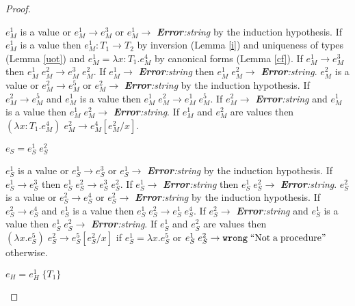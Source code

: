 \begin{theorem}
\begin{proof}
\begin{case}
$e_{M}^{1}$ is a value or $e_{M}^{1}\rightarrow e_{M}^{3}$ or $e_{M}^{1}\rightarrow$ \emph{\textbf{Error}:\;string} by the induction hypothesis.  If $e_{M}^{1}$ is a value then $e_{M}^{1}:T_{1}\rightarrow T_{2}$ by inversion (Lemma \ref{i}) and uniqueness of types (Lemma \ref{uot}) and $e_{M}^{1}=\lambda x:T_{1}.e_{M}^{4}$ by canonical forms (Lemma \ref{cf}).  If $e_{M}^{1}\rightarrow e_{M}^{3}$ then $e_{M}^{1}\;e_{M}^{2}\rightarrow e_{M}^{3}\;e_{M}^{2}$.  If $e_{M}^{1}\rightarrow$ \emph{\textbf{Error}:\;string} then $e_{M}^{1}\;e_{M}^{2}\rightarrow$ \emph{\textbf{Error}:\;string}.  $e_{M}^{2}$ is a value or $e_{M}^{2}\rightarrow e_{M}^{5}$ or $e_{M}^{2}\rightarrow$ \emph{\textbf{Error}:\;string} by the induction hypothesis.  If $e_{M}^{2}\rightarrow e_{M}^{5}$ and $e_{M}^{1}$ is a value then $e_{M}^{1}\;e_{M}^{2}\rightarrow e_{M}^{1}\;e_{M}^{5}$.  If $e_{M}^{2}\rightarrow$ \emph{\textbf{Error}:\;string} and $e_{M}^{1}$ is a value then $e_{M}^{1}\;e_{M}^{2}\rightarrow$ \emph{\textbf{Error}:\;string}.  If $e_{M}^{1}$ and $e_{M}^{2}$ are values then $(\lambda x:T_{1}.e_{M}^{4})\;e_{M}^{2}\rightarrow e_{M}^{4}[e_{M}^{2}/x]$.
\end{case}
\begin{case}
$e_{S}=e_{S}^{1}\;e_{S}^{2}$

$e_{S}^{1}$ is a value or $e_{S}^{1}\rightarrow e_{S}^{3}$ or $e_{S}^{1}\rightarrow$ \emph{\textbf{Error}:\;string} by the induction hypothesis.  If $e_{S}^{1}\rightarrow e_{S}^{3}$ then $e_{S}^{1}\;e_{S}^{2}\rightarrow e_{S}^{3}\;e_{S}^{2}$.  If $e_{S}^{1}\rightarrow$ \emph{\textbf{Error}:\;string} then $e_{S}^{1}\;e_{S}^{2}\rightarrow$ \emph{\textbf{Error}:\;string}.  $e_{S}^{2}$ is a value or $e_{S}^{2}\rightarrow e_{S}^{4}$ or $e_{S}^{2}\rightarrow$ \emph{\textbf{Error}:\;string} by the induction hypothesis.  If $e_{S}^{2}\rightarrow e_{S}^{4}$ and $e_{S}^{1}$ is a value then $e_{S}^{1}\;e_{S}^{2}\rightarrow e_{S}^{1}\;e_{S}^{4}$.  If $e_{S}^{2}\rightarrow$ \emph{\textbf{Error}:\;string} and $e_{S}^{1}$ is a value then $e_{S}^{1}\;e_{S}^{2}\rightarrow$ \emph{\textbf{Error}:\;string}.  If $e_{S}^{1}$ and $e_{S}^{2}$ are values then $(\lambda x.e_{S}^{5})\;e_{S}^{2}\rightarrow e_{S}^{5}[e_{S}^{2}/x]$ if $e_{S}^{1}=\lambda x.e_{S}^{5}$ or $e_{S}^{1}\;e_{S}^{2}\rightarrow\mathtt{wrong}\;\mathrm{``Not\;a\;procedure"}$ otherwise.
\end{case}
\begin{case}
$e_{H}=e_{H}^{1}\;\lbrace T_{1}\rbrace$


\end{case}
\end{proof}
\end{theorem}
